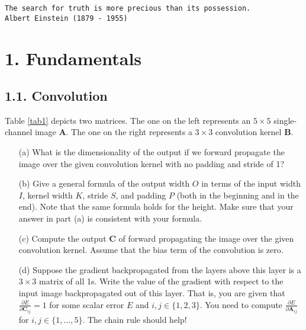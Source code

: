 \documentclass[12pt,letterpaper]{article}
\newcommand{\matr}[1]{\bm{#1}}     %
\begin{document}
\begin{center}
\texttt{The search for truth is more precious than its possession.\\  Albert Einstein (1879 - 1955)}
\end{center}

\section*{1. Fundamentals}
\subsection*{1.1. Convolution}
Table \ref{tab1} depicts two matrices. The one on the left represents an $5\times 5$ single-channel image $\matr{A}$. The one on the right
 represents a $3\times 3$ convolution kernel $\matr{B}$. 
\begin{itemize}
    \item[(a)] What is the dimensionality of the output if we forward propagate the image over the given convolution kernel with no padding and stride of 1? 
  
    \item[(b)] Give a general formula of the output width $O$ in terms of the input width $I$, kernel width $K$, stride $S$, and padding $P$ (both in the beginning and in the end). Note that the same formula holds for the height. Make sure that your answer in part (a) is consistent with your formula. 

    \item[(c)] Compute the output $\matr{C}$ of forward propagating the image over the
given convolution kernel. Assume that the bias term of the convolution is zero.

    \item[(d)] Suppose the gradient backpropagated from the layers above this layer is a $3\times 3$ matrix of all 1s. Write the value of the gradient with respect to the input image backpropagated out of this layer.
    That is, you are given that $\frac{\partial E}{\partial \matr{C}_{ij}} = 1$ for some scalar error $E$ and $i,j\in\{1,2,3\}$. You need to compute $\frac{\partial E}{\partial \matr{A}_{ij}}$ for  $i,j\in\{1, \ldots, 5\}$. The chain rule should help!
     
     
\end{itemize}
 
\end{document}

